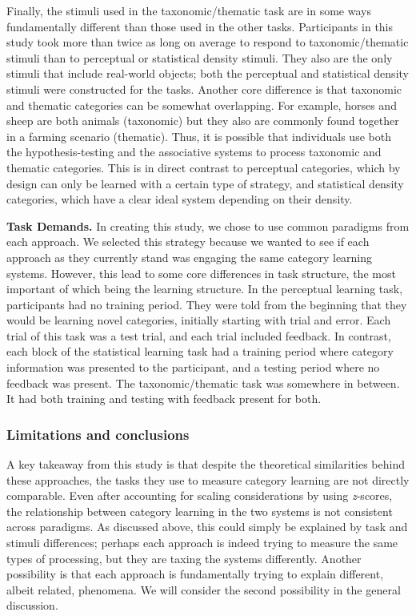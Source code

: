 \documentclass[../dissertation.tex]{subfiles}
\begin{document}
	Finally, the stimuli used in the taxonomic/thematic task are in some ways fundamentally different than those used in the other tasks. Participants in this study took more than twice as long on average to respond to taxonomic/thematic stimuli than to perceptual or statistical density stimuli. They also are the only stimuli that include real-world objects; both the perceptual and statistical density stimuli were constructed for the tasks. Another core difference is that taxonomic and thematic categories can be somewhat overlapping. For example, horses and sheep are both animals (taxonomic) but they also are commonly found together in a farming scenario (thematic). Thus, it is possible that individuals use both the hypothesis-testing and the associative systems to process taxonomic and thematic categories. This is in direct contrast to perceptual categories, which by design can only be learned with a certain type of strategy, and statistical density categories, which have a clear ideal system depending on their density. \par
\textbf{Task Demands.} In creating this study, we chose to use common paradigms from each approach. We selected this strategy because we wanted to see if each approach as they currently stand was engaging the same category learning systems. However, this lead to some core differences in task structure, the most important of which being the learning structure. In the perceptual learning task, participants had no training period. They were told from the beginning that they would be learning novel categories, initially starting with trial and error. Each trial of this task was a test trial, and each trial included feedback. In contrast, each block of the statistical learning task had a training period where category information was presented to the participant, and a testing period where no feedback was present. The taxonomic/thematic task was somewhere in between. It had both training and testing with feedback present for both.
	
\subsubsection{Limitations and conclusions}

A key takeaway from this study is that despite the theoretical similarities behind these approaches, the tasks they use to measure category learning are not directly comparable. Even after accounting for scaling considerations by using \textit{z}-scores, the relationship between category learning in the two systems is not consistent across paradigms. As discussed above, this could simply be explained by task and stimuli differences; perhaps each approach is indeed trying to measure the same types of processing, but they are taxing the systems differently. Another possibility is that each approach is fundamentally trying to explain different, albeit related, phenomena. We will consider the second possibility in the general discussion.
\end{document}
